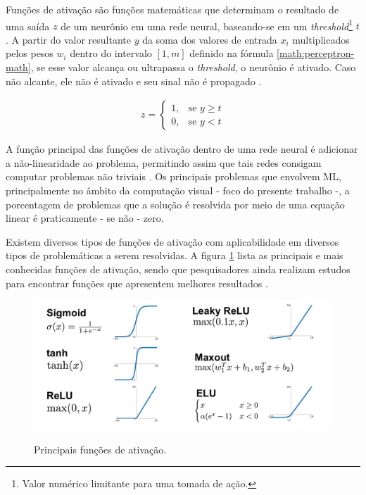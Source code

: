 Funções de ativação são funções matemáticas que determinam o resultado de uma saída \textbf{\(z\)} de um neurônio em uma rede neural, baseando-se em um \textit{threshold}\footnote{
  Valor numérico limitante para uma tomada de ação.
} \textbf{\(t\)}.
A partir do valor resultante \textbf{\(y\)} da soma dos valores de entrada \(x_i\) multiplicados pelos pesos \(w_i\) dentro do intervalo \([1, m]\) definido na fórmula \ref{math:perceptron-math}, se esse valor alcança ou ultrapassa o \textit{threshold}, o neurônio é ativado. Caso não alcante, ele não é ativado e seu sinal não é propagado \cite{python-ml}.

\begin{gather}
  z =
  \begin{cases}
    1, & \text{se } y\geq \textit{t} \\
    0, & \text{se } y < \textit{t}
  \end{cases}
  \label{math:threshold}
\end{gather}

A função principal das funções de ativação dentro de uma rede neural é adicionar a não-linearidade ao problema, permitindo assim que tais redes consigam computar problemas não triviais \cite{gentle-intro-to-nn}. Os principais problemas que envolvem ML, principalmente no âmbito da computação visual - foco do presente trabalho -, a porcentagem de problemas que a solução é resolvida por meio de uma equação linear é praticamente - se não - zero.

Existem diversos tipos de funções de ativação com aplicabilidade em diversos tipos de problemáticas a serem resolvidas. A figura \ref{fig:activation-functions} lista as principais e mais conhecidas funções de ativação, sendo que pesquisadores ainda realizam estudos para encontrar funções que apresentem melhores resultados \cite{intro-to-act-func}.


\begin{figure}[H]
  \centering
  \caption{Principais funções de ativação.}
  \includegraphics[scale=0.3]{figuras/activation-functions}
  \label{fig:activation-functions}
\end{figure}

